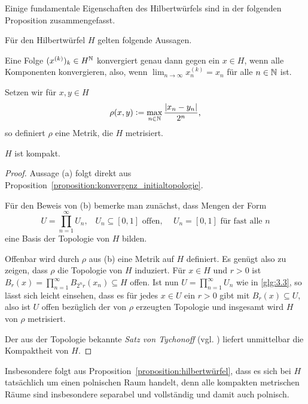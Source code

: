 \documentclass[../thesis/thesis.tex]{subfiles}
\begin{document}
	Einige fundamentale Eigenschaften des Hilbertwürfels sind in der folgenden Proposition zusammengefasst.
	
	\begin{Proposition}
		\label{proposition:hilbertwürfel}
		Für den Hilbertwürfel $H$ gelten folgende Aussagen.
		\begin{enumeratethm}
			\item Eine Folge $(x^{(k)})_k \in H^{\mathbb{N}}$ konvergiert genau dann gegen 
			ein $x \in H$, wenn alle Komponenten konvergieren, also, wenn
			$\lim_{n \to \infty} x_n^{(k)} = x_n$ für alle $n \in \mathbb{N}$ ist.
			\item Setzen wir für $x, y \in H$
			$$\rho(x, y) \vcentcolon = \max_{n \in \mathbb{N}} \frac{|x_n - y_n|}{2^n} \text{,}$$
			so definiert $\rho$ eine Metrik, die $H$ metrisiert.
			\item $H$ ist kompakt.
		\end{enumeratethm}
	\end{Proposition}
	
	\begin{proof}
		Aussage (a) folgt direkt aus Proposition~\ref{proposition:konvergenz_initialtopologie}.
		
		Für den Beweis von (b) bemerke man zunächst, dass Mengen der Form 
		\[U = \prod_{n=1}^{\infty} U_n\text{,} \quad U_n \subseteq [0, 1] \text{ offen, }
		\quad U_n = [0, 1] \text{ für fast alle } n \label{glg:3.3} \tag{3.3}\]
		eine Basis der Topologie von $H$ bilden.
		
		Offenbar wird durch $\rho$ aus (b) eine Metrik auf $H$ definiert. 
		Es genügt also zu zeigen, dass $\rho$ die Topologie von $H$ induziert. 
		Für $x \in H$ und $r > 0$ ist 
		$B_r(x) = \prod_{n=1}^{\infty} B_{2^n r}(x_n) \subseteq H$ 
		offen. Ist nun $U = \prod_{n=1}^{\infty} U_n$ wie in \eqref{glg:3.3}, 
		so lässt sich leicht einsehen, dass es für jedes $x \in U$ ein $r > 0$ 
		gibt mit $B_r(x) \subseteq U$, also ist $U$ offen bezüglich der von $\rho$ 
		erzeugten Topologie und insgesamt wird $H$ von $\rho$ metrisiert.
		
		Der aus der Topologie bekannte \emph{Satz von Tychonoff} (vgl. \cite[Theorem 2.7.1]{Simon.2015}) liefert 
		unmittelbar die Kompaktheit von $H$.
	\end{proof}
	
	\begin{Bemerkung}
		Insbesondere folgt aus Proposition~\ref{proposition:hilbertwürfel}, dass es sich bei $H$ tatsächlich um einen polnischen Raum handelt, 
		denn alle kompakten metrischen Räume sind insbesondere 
		separabel und vollständig und damit auch polnisch.
	\end{Bemerkung}
	
\end{document}
